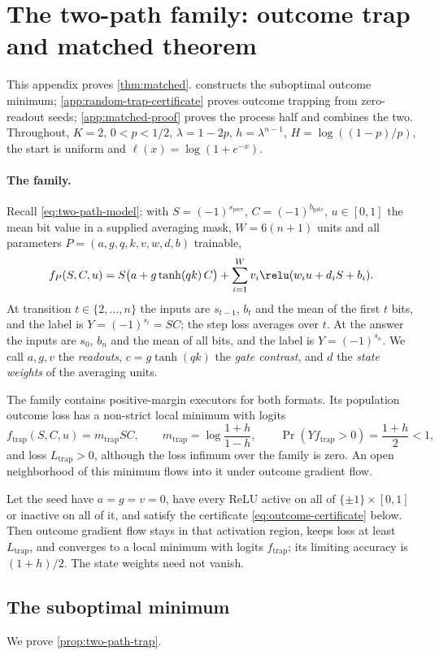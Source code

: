 \section{The two-path family: outcome trap and matched theorem}
\label{app:two-path}
This appendix proves \cref{thm:matched}.  constructs the
suboptimal outcome minimum; \cref{app:random-trap-certificate} proves outcome
trapping from zero-readout seeds; \cref{app:matched-proof} proves the process
half and combines the two. Throughout, $K=2$, $0<p<1/2$, $\lambda=1-2p$,
$h=\lambda^{n-1}$, $H=\log((1-p)/p)$, the start is uniform and
$\ell(x)=\log(1+e^{-x})$.

\paragraph{The family.} Recall \cref{eq:two-path-model}: with $S=(-1)^{s_{\mathrm{prev}}}$,
$C=(-1)^{b_{\mathrm{gate}}}$, $u\in[0,1]$ the mean bit value in a supplied averaging mask,
$W=6(n+1)$ units and all parameters $P=(a,g,q,k,v,w,d,b)$ trainable,
\[
 f_P(S,C,u)=S\bigl(a+g\tanh(qk)\,C\bigr)
 +\sum_{i=1}^{W}v_i\relu(w_i u+d_iS+b_i).
\]
At transition $t\in\{2,\ldots,n\}$ the inputs are $s_{t-1}$, $b_t$ and the mean of the first $t$ bits,
and the label is $Y=(-1)^{s_t}=SC$; the step loss averages over $t$. At the answer the
inputs are $s_0$, $b_n$ and the mean of all bits, and the label is $Y=(-1)^{s_n}$.
We call $a,g,v$ the \emph{readouts}, $c=g\tanh(qk)$ the \emph{gate contrast}, and $d$ the
\emph{state weights} of the averaging units.

\begin{proposition}
\label{prop:two-path-trap}
The family contains positive-margin executors for both formats. Its population outcome
loss has a non-strict local minimum with logits
\[
 f_{\mathrm{trap}}(S,C,u)=m_{\mathrm{trap}}SC,\qquad m_{\mathrm{trap}}=\log\frac{1+h}{1-h},
 \qquad \Pr(Yf_{\mathrm{trap}}>0)=\frac{1+h}2<1,
\]
and loss $L_{\mathrm{trap}}>0$, although the loss infimum over the family is zero.
An open neighborhood of this minimum flows into it under outcome gradient flow.
\end{proposition}

\begin{proposition}
\label{prop:random-outcome-trap}
Let the seed have $a=g=v=0$, have every ReLU active on all of $\{\pm1\}\times[0,1]$ or inactive on
all of it, and satisfy the certificate \cref{eq:outcome-certificate} below. Then outcome gradient flow
stays in that activation region, keeps loss at least $L_{\mathrm{trap}}$, and converges to a local
minimum with logits $f_{\mathrm{trap}}$; its limiting accuracy is $(1+h)/2$. The state weights need not vanish.
\end{proposition}

\subsection{The suboptimal minimum}
\label{app:two-path-trap}
We prove \cref{prop:two-path-trap}.
